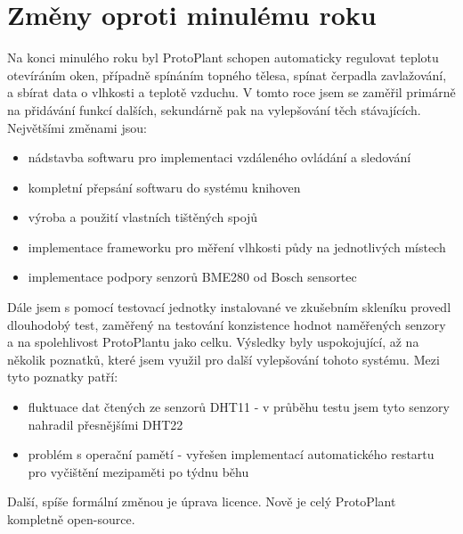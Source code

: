 \chapter{Změny oproti minulému roku}
Na konci minulého roku byl ProtoPlant schopen automaticky regulovat teplotu otevíráním oken, případně spínáním topného tělesa, spínat čerpadla zavlažování, a sbírat data o vlhkosti a teplotě vzduchu. V tomto roce jsem se zaměřil primárně na přidávání funkcí dalších, sekundárně pak na vylepšování těch stávajících.
Největšími změnami jsou: 
\begin{itemize}
    \item nádstavba softwaru pro implementaci vzdáleného ovládání a sledování
	\item kompletní přepsání softwaru do systému knihoven
	\item výroba a použití vlastních tištěných spojů
	\item implementace frameworku pro měření vlhkosti půdy na jednotlivých místech
	\item implementace podpory senzorů BME280 od Bosch sensortec
\end{itemize}

Dále jsem s pomocí testovací jednotky instalované ve zkušebním skleníku provedl dlouhodobý test, zaměřený na testování konzistence hodnot naměřených senzory a na spolehlivost ProtoPlantu jako celku. Výsledky byly uspokojující, až na několik poznatků, které jsem využil pro další vylepšování tohoto systému. Mezi tyto poznatky patří:
\begin{itemize}
    \item fluktuace dat čtených ze senzorů DHT11 - v průběhu testu jsem tyto senzory nahradil přesnějšími DHT22
    \item problém s operační pamětí - vyřešen implementací automatického restartu pro vyčištění mezipaměti po týdnu běhu
\end{itemize}

Další, spíše formální změnou je úprava licence. Nově je celý ProtoPlant kompletně open-source.
\newpage

